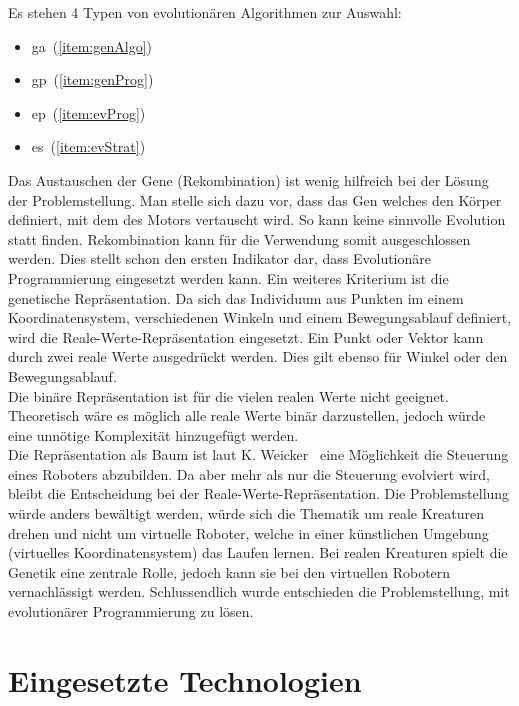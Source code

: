     Es stehen 4 Typen von evolutionären Algorithmen zur Auswahl:

    \begin{itemize}
      \item \acrfull{ga}~(\vref{item:genAlgo})
      \item \acrfull{gp}~(\vref{item:genProg})
      \item \acrfull{ep}~(\vref{item:evProg})
      \item \acrfull{es}~(\vref{item:evStrat})
    \end{itemize}


    Das Austauschen der Gene (Rekombination) ist wenig hilfreich bei der Lösung der Problemstellung.
    Man stelle sich dazu vor, dass das Gen welches den Körper definiert, mit dem des Motors vertauscht wird.
    So kann keine sinnvolle Evolution statt finden.
    Rekombination kann für die Verwendung somit ausgeschlossen werden.
    Dies stellt schon den ersten Indikator dar,
    dass Evolutionäre Programmierung eingesetzt werden kann.
    Ein weiteres Kriterium ist die genetische Repräsentation.
    Da sich das Individuum aus Punkten im einem Koordinatensystem,
    verschiedenen Winkeln und einem Bewegungsablauf definiert, wird die Reale-Werte-Repräsentation eingesetzt.
    Ein Punkt oder Vektor kann durch zwei reale Werte ausgedrückt werden.
    Dies gilt ebenso für Winkel oder den Bewegungsablauf.
    \\
    Die binäre Repräsentation ist für die vielen realen Werte nicht geeignet.
    Theoretisch wäre es möglich alle reale Werte binär darzustellen,
    jedoch würde eine unnötige Komplexität hinzugefügt werden.
    \\
    Die Repräsentation als Baum ist laut K. Weicker~\cite{book:evAlgo} eine Möglichkeit die Steuerung eines Roboters abzubilden.
    Da aber mehr als nur die Steuerung evolviert wird, bleibt die Entscheidung bei der Reale-Werte-Repräsentation.
    Die Problemstellung würde anders bewältigt werden,
    würde sich die Thematik um reale Kreaturen drehen und nicht um virtuelle Roboter,
    welche in einer künstlichen Umgebung (virtuelles Koordinatensystem) das Laufen lernen.
    Bei realen Kreaturen spielt die Genetik eine zentrale Rolle,
    jedoch kann sie bei den virtuellen Robotern vernachlässigt werden.
    Schlussendlich wurde entschieden die Problemstellung, mit evolutionärer Programmierung zu lösen.

  \section{Eingesetzte Technologien\label{sec:Technology}}

